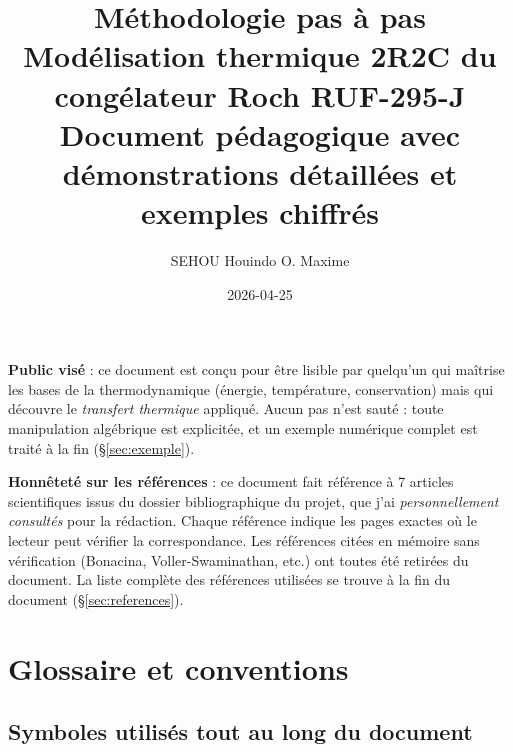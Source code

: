 \documentclass[11pt,a4paper]{article}
\title{\textbf{Méthodologie pas à pas}\\[0.3em]
       \large Modélisation thermique 2R2C du congélateur Roch RUF-295-J\\
       \large Document pédagogique avec démonstrations détaillées et exemples chiffrés}
\author{SEHOU Houindo O. Maxime}
\date{2026-04-25}
\begin{document}
\maketitle

\begin{honnete}
\textbf{Public visé} : ce document est conçu pour être lisible par quelqu'un qui maîtrise
les bases de la thermodynamique (énergie, température, conservation) mais qui découvre le
\emph{transfert thermique} appliqué. Aucun pas n'est sauté : toute manipulation algébrique
est explicitée, et un exemple numérique complet est traité à la fin (\S\ref{sec:exemple}).

\textbf{Honnêteté sur les références} : ce document fait référence à 7 articles scientifiques
issus du dossier bibliographique du projet, que j'ai \emph{personnellement consultés} pour la
rédaction. Chaque référence indique les pages exactes où le lecteur peut vérifier la
correspondance. Les références citées en mémoire sans vérification (Bonacina,
Voller-Swaminathan, etc.) ont toutes été retirées du document. La liste complète des
références utilisées se trouve à la fin du document (\S\ref{sec:references}).
\end{honnete}

\tableofcontents

\newpage

\section{Glossaire et conventions}

\subsection{Symboles utilisés tout au long du document}
\end{document}

